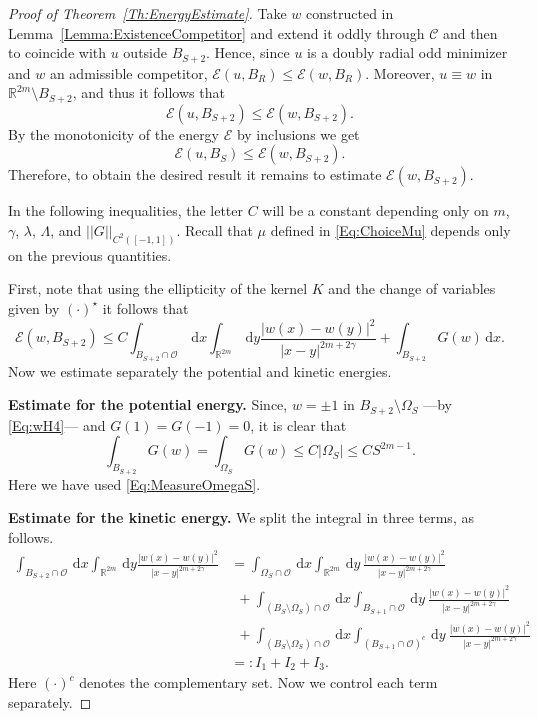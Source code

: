 \documentclass[12pt,reqno]{amsart}
\theoremstyle{definition}
\theoremstyle{remark}
\newcommand{\con}[1]{\mathbb{#1}}
\newcommand{\R}{\con{R}} %
\newcommand{\ccal}{\mathscr{C}}
\newcommand{\ecal}{\mathcal{E}}
\newcommand{\ocal}{\mathcal{O}}
\newcommand{\norm}[1]{\left | \left |{#1} \right | \right |}
\newcommand{\s}{\gamma}
\renewcommand{\d}{\,\mathrm{d}} %
\numberwithin{equation}{section}
\begin{document}
\begin{proof}[Proof of Theorem~\ref{Th:EnergyEstimate}]
	Take $w$ constructed in Lemma~\ref{Lemma:ExistenceCompetitor} and extend it oddly through $\ccal$ and then to coincide with $u$ outside $B_{S+2}$.  Hence, since $u$ is a doubly radial odd minimizer and $w$ an admissible competitor, $ \ecal (u, B_R) \leq \ecal (w, B_R)$. Moreover, $u\equiv w$ in $\R^{2m}\setminus B_{S+2}$, and thus it follows that
	$$ 
	\ecal (u, B_{S+2}) \leq \ecal (w, B_{S+2}).
	$$
	By the monotonicity of the energy $\ecal$ by inclusions we get
	$$ 
	\ecal (u, B_{S}) \leq \ecal (w, B_{S+2}). 
	$$
	Therefore, to obtain the desired result it remains to estimate $\ecal (w, B_{S+2})$. 
	
	
	In the following inequalities, the letter $C$ will be a constant depending only on $m$, $\s$, $\lambda$, $\Lambda$, and $\norm{G}_{C^2([-1,1])}$. Recall that $\mu$ defined in \eqref{Eq:ChoiceMu} depends only on the previous quantities.
	
	First, note that using the ellipticity of the kernel $K$ and the change of variables given by $(\cdot)^\star$ it follows that
	$$ 
	\ecal(w,B_{S+2}) \leq C \int_{B_{S+2}\cap \ocal} \d x \int_{\R^{2m}} \d y \frac{|w(x)-w(y)|^2}{|x-y|^{2m+2\s}} + \int_{B_{S+2}} G(w) \d x. 
	$$
	Now we estimate separately the potential and kinetic energies.
	
	\medskip
	
	\textbf{Estimate for the potential energy.}
	Since, $w=\pm 1$ in $B_{S+2} \setminus \Omega_S$ ---by \eqref{Eq:wH4}--- and $G(1) = G(-1) = 0$, it is clear that
	$$ 
	\int_{B_{S+2}} G(w) = \int_{\Omega_S} G(w) \leq C |\Omega_S| \leq C S^{2m-1}.
	$$  
	Here we have used \eqref{Eq:MeasureOmegaS}.
	
	\medskip
	
	\textbf{Estimate for the kinetic energy.}
	We split the integral in three terms, as follows.
	\begin{align*}
	\int_{B_{S+2}\cap \ocal} \d x \int_{\R^{2m}} \d y \frac{|w(x)-w(y)|^2}{|x-y|^{2m+2\s}} &= \int_{\Omega_{S}\cap \ocal} \d x \int_{\R^{2m}} \d y \ \frac{|w(x)-w(y)|^2}{|x-y|^{2m+2\s}} \\
	&\ \ + \int_{(B_S\setminus \Omega_S)\cap \ocal} \d x \int_{B_{S+1}\cap \ocal} \d y \ \frac{|w(x)-w(y)|^2}{|x-y|^{2m+2\s}} \\
	&\ \ + \int_{(B_S\setminus \Omega_S)\cap \ocal} \d x \int_{(B_{S+1}\cap \ocal)^c} \d y \ \frac{|w(x)-w(y)|^2}{|x-y|^{2m+2\s}} \\
	&=: I_1+I_2+I_3.
	\end{align*}
	Here $(\cdot)^c$ denotes the complementary set. Now we control each term separately.
	

\end{proof}
\end{document}
